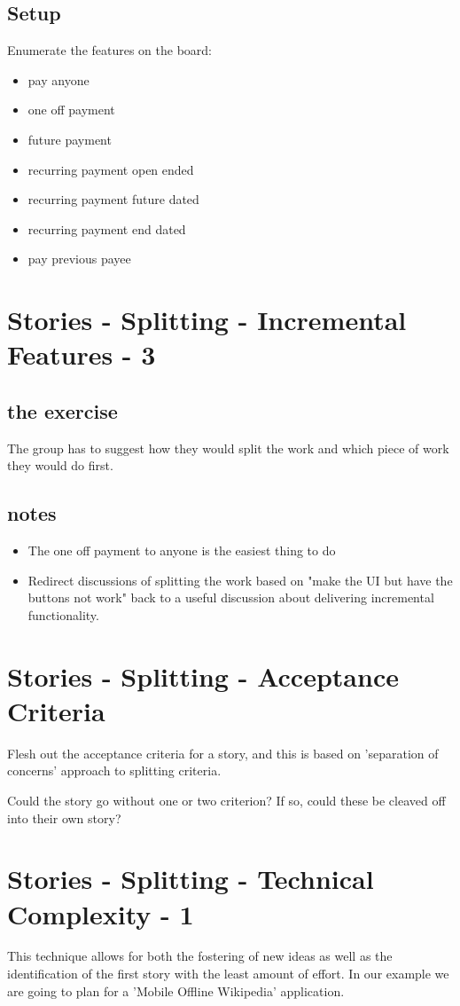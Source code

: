 \subsection*{Setup}
Enumerate the features on the board:
\begin{itemize}
\item pay anyone
\item one off payment
\item future payment
\item recurring payment open ended
\item recurring payment future dated
\item recurring payment end dated
\item pay previous payee
\end{itemize}

\section*{Stories - Splitting - Incremental Features - 3}
\subsection*{the exercise}
The group has to suggest how they would split the work and which piece of work they would do first.

\subsection*{notes}
\begin{itemize}
\item The one off payment to anyone is the easiest thing to do
\item Redirect discussions of splitting the work based on "make the UI but have the buttons not work" back to a useful discussion about delivering incremental functionality.
\end{itemize}

\clearpage
\section*{Stories - Splitting - Acceptance Criteria}
Flesh out the acceptance criteria for a story, and this is based on 'separation of concerns' approach to splitting criteria.

Could the story go without one or two criterion? If so, could these be cleaved off into their own story?

\clearpage
\section*{Stories - Splitting - Technical Complexity - 1}
This technique allows for both the fostering of new ideas as well as the identification of the first story with the least amount of effort. In our example we are going to plan for a 'Mobile Offline Wikipedia' application.

